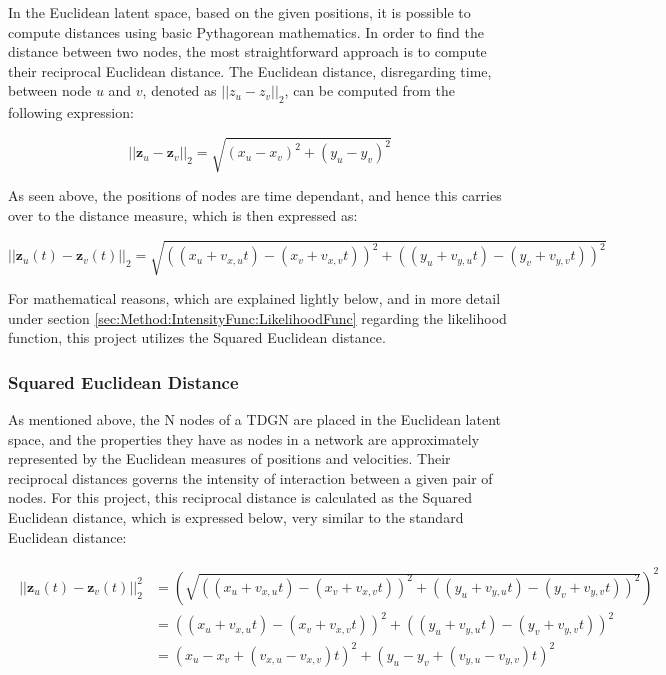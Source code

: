 In the Euclidean latent space, based on the given positions, it is possible to compute distances using basic Pythagorean mathematics. 
In order to find the distance between two nodes, the most straightforward approach is to compute their reciprocal Euclidean distance.
The Euclidean distance, disregarding time, between node $u$ and $v$, denoted as $||z_u - z_v||_2$, can be computed from the following expression:

\begin{equation}
    ||\textbf{z}_u - \textbf{z}_v||_2
= 
\sqrt{(x_u - x_v)^2 + (y_u - y_v)^2}
\end{equation}

As seen above, the positions of nodes are time dependant, and hence this carries over to the distance measure, which is then expressed as:

\begin{equation}
    ||\textbf{z}_u(t) - \textbf{z}_v(t)||_2
= 
\sqrt{((x_u + v_{x,u}t) - (x_v + v_{x,v}t))^2 + ((y_u + v_{y,u}t) - (y_v + v_{y,v}t))^2}
\end{equation}

For mathematical reasons, which are explained lightly below, and in more detail under section \ref{sec:Method:IntensityFunc:LikelihoodFunc} regarding the likelihood function, this project utilizes the Squared Euclidean distance.

\subsubsection{Squared Euclidean Distance}
\label{sec:Method:LSM:SquaredEuclideanDistance}
As mentioned above, the N nodes of a TDGN are placed in the Euclidean latent space, and the properties they have as nodes in a network are approximately represented by the Euclidean measures of positions and velocities.
Their reciprocal distances governs the intensity of interaction between a given pair of nodes.
For this project, this reciprocal distance is calculated as the Squared Euclidean distance, which is expressed below, very similar to the standard Euclidean distance:

\begin{align} 
\begin{split}
||\textbf{z}_u(t) - \textbf{z}_v(t)||_2^2
&= 
\left(\sqrt{((x_u + v_{x,u}t) - (x_v + v_{x,v}t))^2 + ((y_u + v_{y,u}t) - (y_v + v_{y,v}t))^2}\right)^2
\\
&=
((x_u + v_{x,u}t) - (x_v + v_{x,v}t))^2 + ((y_u + v_{y,u}t) - (y_v + v_{y,v}t))^2
\\
&=
(x_u - x_v + (v_{x,u} - v_{x,v})t)^2 + (y_u - y_v + ( v_{y,u} - v_{y,v})t)^2
\end{split}
\end{align}




